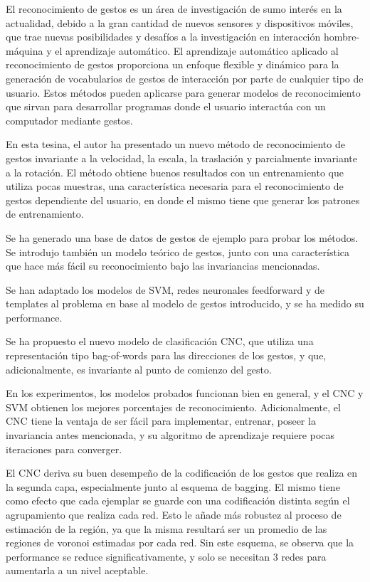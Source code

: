 
El reconocimiento de gestos es un área de investigación de sumo interés en la actualidad, debido a la gran cantidad de nuevos sensores y dispositivos móviles, que trae nuevas posibilidades y desafíos a la investigación en interacción hombre-máquina y el aprendizaje automático. El aprendizaje automático aplicado al reconocimiento de gestos proporciona un enfoque flexible y dinámico para la generación de vocabularios de gestos de interacción por parte de cualquier tipo de usuario. Estos métodos pueden aplicarse para generar modelos de reconocimiento que sirvan para desarrollar programas donde el usuario interactúa con un computador mediante gestos.

En esta tesina, el autor ha presentado un nuevo método de reconocimiento de gestos invariante a la velocidad, la escala, la traslación y parcialmente invariante a la rotación. El método obtiene buenos resultados con un entrenamiento que utiliza pocas muestras, una característica necesaria para el reconocimiento de gestos dependiente del usuario, en donde el mismo tiene que generar los patrones de entrenamiento. 

Se ha generado una base de datos de gestos de ejemplo para probar los métodos. Se introdujo también un modelo teórico de gestos, junto con una característica que hace más fácil su reconocimiento bajo las invariancias mencionadas. 

Se han adaptado los modelos de SVM, redes neuronales feedforward y de templates al problema en base al modelo de gestos introducido, y se ha medido su performance. 

Se ha propuesto el nuevo modelo de clasificación CNC, que utiliza una representación tipo bag-of-words para las direcciones de los gestos, y que, adicionalmente, es invariante al punto de comienzo del gesto.
 
En los experimentos, los modelos probados funcionan bien en general, y el CNC y SVM obtienen los mejores porcentajes de reconocimiento. Adicionalmente, el CNC tiene la ventaja de ser fácil para implementar, entrenar, poseer la invariancia antes mencionada, y su algoritmo de aprendizaje requiere pocas iteraciones para converger.


El CNC deriva su buen desempeño de la codificación de los gestos que realiza en la segunda capa, especialmente junto al esquema de bagging. El mismo tiene como efecto que cada ejemplar se guarde con una codificación distinta según el agrupamiento que realiza cada red. Esto le añade más robustez al proceso de estimación de la región, ya que la misma resultará ser un promedio de las regiones de voronoi estimadas por cada red. Sin este esquema, se observa que la performance se reduce significativamente, y solo se necesitan 3 redes para aumentarla a un nivel aceptable.


